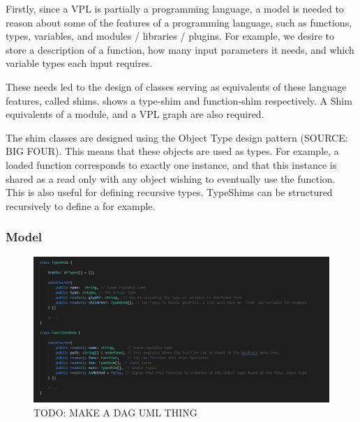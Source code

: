 Firstly, since a VPL is partially a programming language, a model is needed to reason about some of the features of a programming language, such as functions, types, variables, and modules / libraries / plugins.
For example, we desire to store a description of a function, how many input parameters it needs, and which variable types each input requires. 

These needs led to the design of classes serving as equivalents of these language features, called shims. 
 shows a type-shim and function-shim respectively. 
A Shim equivalents of a module, and a VPL graph are also required. 

The shim classes are designed using the Object Type design pattern (SOURCE: BIG FOUR). 
This means that these objects are used as types. 
For example, a loaded function corresponds to exactly one  instance, and that this instance is shared as a read only with any object wishing to eventually use the function. 
This is also useful for defining recursive types. 
TypeShims can be structured recursively to define a  for example. 



\subsubsection*{Model}

\begin{figure}
  \centering
  \graphicspath{ {../../assets/images/implementation/} }
  \includegraphics[width=\linewidth]{shim-uml.png}
  \caption[Shim Classes]{TODO: MAKE A DAG UML THING}
  \label{fig:dag-model}
\end{figure}

